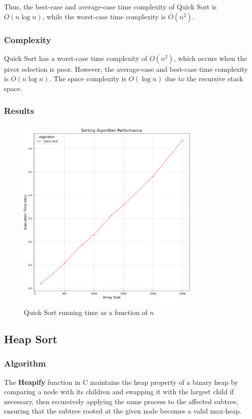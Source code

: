 \documentclass{article}
\begin{document}
Thus, the best-case and average-case time complexity of Quick Sort is $O(n \log n)$, while the worst-case time complexity is $O(n^2)$.

\subsubsection{Complexity}
Quick Sort has a worst-case time complexity of $O(n^2)$, which occurs when the pivot selection is poor. However, the average-case and best-case time complexity is $O(n \log n)$. The space complexity is $O(\log n)$ due to the recursive stack space.

\subsubsection{Results}
\begin{figure}[H]
	\includegraphics[width=0.8\textwidth]{images/quick_sort.png}
	\caption{Quick Sort running time as a function of $n$}
\end{figure}


\subsection{Heap Sort}

\subsubsection{Algorithm}
The \textbf{Heapify} function in C maintains the heap property of a binary heap by comparing a node with its children and swapping it with the largest child if necessary, then recursively applying the same process to the affected subtree, ensuring that the subtree rooted at the given node becomes a valid max-heap.
\end{document}
